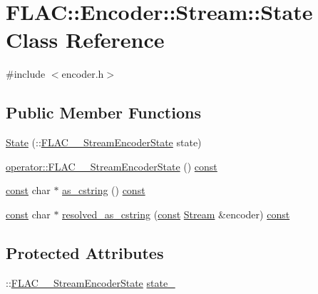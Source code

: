 \hypertarget{class_f_l_a_c_1_1_encoder_1_1_stream_1_1_state}{}\section{F\+L\+AC\+:\+:Encoder\+:\+:Stream\+:\+:State Class Reference}
\label{class_f_l_a_c_1_1_encoder_1_1_stream_1_1_state}


{\ttfamily \#include $<$encoder.\+h$>$}

\subsection*{Public Member Functions}
\begin{DoxyCompactItemize}
\item 
\hyperlink{class_f_l_a_c_1_1_encoder_1_1_stream_1_1_state_a64b68350cffe445da0f7f0b39f14fd5b}{State} (\+::\hyperlink{group__flac__stream__encoder_gac5e9db4fc32ca2fa74abd9c8a87c02a5}{F\+L\+A\+C\+\_\+\+\_\+\+Stream\+Encoder\+State} state)
\item 
\hyperlink{class_f_l_a_c_1_1_encoder_1_1_stream_1_1_state_a0dec60b83c2e060ff569cc64e99709e3}{operator\+::\+F\+L\+A\+C\+\_\+\+\_\+\+Stream\+Encoder\+State} () \hyperlink{getopt1_8c_a2c212835823e3c54a8ab6d95c652660e}{const} 
\item 
\hyperlink{getopt1_8c_a2c212835823e3c54a8ab6d95c652660e}{const} char $\ast$ \hyperlink{class_f_l_a_c_1_1_encoder_1_1_stream_1_1_state_a500a757f70e84360c3001430582237d3}{as\+\_\+cstring} () \hyperlink{getopt1_8c_a2c212835823e3c54a8ab6d95c652660e}{const} 
\item 
\hyperlink{getopt1_8c_a2c212835823e3c54a8ab6d95c652660e}{const} char $\ast$ \hyperlink{class_f_l_a_c_1_1_encoder_1_1_stream_1_1_state_a7cbc1b32b54af4606abf81b6c336262e}{resolved\+\_\+as\+\_\+cstring} (\hyperlink{getopt1_8c_a2c212835823e3c54a8ab6d95c652660e}{const} \hyperlink{class_f_l_a_c_1_1_encoder_1_1_stream}{Stream} \&encoder) \hyperlink{getopt1_8c_a2c212835823e3c54a8ab6d95c652660e}{const} 
\end{DoxyCompactItemize}
\subsection*{Protected Attributes}
\begin{DoxyCompactItemize}
\item 
\+::\hyperlink{group__flac__stream__encoder_gac5e9db4fc32ca2fa74abd9c8a87c02a5}{F\+L\+A\+C\+\_\+\+\_\+\+Stream\+Encoder\+State} \hyperlink{class_f_l_a_c_1_1_encoder_1_1_stream_1_1_state_af6d7a77454f9a33c813ade45f95dad8c}{state\+\_\+}
\end{DoxyCompactItemize}


